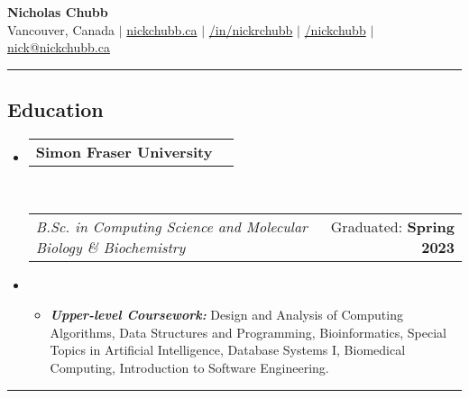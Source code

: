 \documentclass[10pt,a4paper]{article}
\makeatletter
\newcommand{\headerrow}[2]
{\begin{tabular*}{\linewidth}{l@{\extracolsep{\fill}}r}
	#1 &
	#2 \\
\end{tabular*}}
\makeatother
\begin{document}
 

\begin{center}

{\Huge \textbf{Nicholas Chubb}} \\
\vspace{1em}
{\small
{{ }\faHome { }Vancouver, Canada} $|$ 
{{ }\faGlobe { } \href{https://nickchubb.ca/}{nickchubb.ca}} $|$ 
{{ }\faLinkedinSquare { } \href{https://linkedin.com/in/nickrchubb}{/in/nickrchubb}} $|$ 
{{ }\faGithub { } \href{https://github.com/NickChubb}{/nickchubb}} $|$ 
{{ }\faEnvelope { } \href{mailto:nick@nickchubb.ca}{nick@nickchubb.ca}}\\ \vspace{.2em}
}
\end{center}

\hrule
\vspace{-0.5em}

\subsection*{Education}

\vspace{-0.2em}

\begin{itemize}[leftmargin=0em]

	\parskip=0.1em

	\item[] 
	\headerrow
		{\textbf{Simon Fraser University}}
        {}
	\\
	\headerrow
		{\textit{B.Sc. in Computing Science and Molecular Biology \& Biochemistry}}
		{\small{{Graduated:} \textbf{Spring 2023}}}
		
	\item[]
	\begin{itemize}
	\item 
	{ \small
	\textbf{\textit{Upper-level Coursework: }}Design and Analysis of Computing Algorithms, Data Structures and Programming, Bioinformatics, Special Topics in Artificial Intelligence, Database Systems I, Biomedical Computing, Introduction to Software Engineering.
	}
	\end{itemize}
	

\end{itemize}

\vspace{0.2em}
\hrule %
\vspace{-0.4em}
\end{document}
